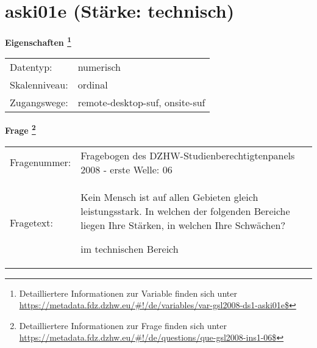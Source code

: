 
    \setcounter{footnote}{0}

    \vspace*{-1.8cm}
	\section{aski01e (Stärke: technisch)}
	\label{section:aski01e}



    \vspace*{0.5cm}
    \noindent\textbf{Eigenschaften
	\footnote{Detailliertere Informationen zur Variable finden sich unter
		\url{https://metadata.fdz.dzhw.eu/\#!/de/variables/var-gsl2008-ds1-aski01e$}}}\\
	\begin{tabularx}{\hsize}{@{}lX}
	Datentyp: & numerisch \\
	Skalenniveau: & ordinal \\
	Zugangswege: &
	  remote-desktop-suf, 
	  onsite-suf
 \\
    \end{tabularx}



				\vspace*{0.5cm}
                \noindent\textbf{Frage
	                \footnote{Detailliertere Informationen zur Frage finden sich unter
		              \url{https://metadata.fdz.dzhw.eu/\#!/de/questions/que-gsl2008-ins1-06$}}}\\
				\begin{tabularx}{\hsize}{@{}lX}
					Fragenummer: &
					  Fragebogen des DZHW-Studienberechtigtenpanels 2008 - erste Welle:
					  06
 \\
					Fragetext: & Kein Mensch ist auf allen Gebieten gleich leistungsstark. In welchen der folgenden Bereiche liegen Ihre Stärken, in welchen Ihre Schwächen?\par  im technischen Bereich \\
				\end{tabularx}





